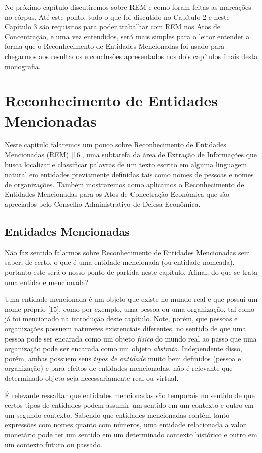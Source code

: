 \documentclass[11pt]{report}
\begin{document}
No próximo capítulo discutiremos sobre REM e como foram feitas as marcações no córpus. Até este ponto, tudo o que foi discutido no Capítulo 2 e neste Capítulo 3 são
requisitos para poder trabalhar com REM nos Atos de Concentração, e uma vez entendidos, será mais simples para o leitor entender a forma que o Reconhecimento de Entidades
Mencionadas foi usado para chegarmos aos resultados e conclusões apresentados nos dois capítulos finais desta monografia.

\pagebreak
\chapter{Reconhecimento de Entidades Mencionadas}

\indent\indent Neste capítulo falaremos um pouco sobre Reconhecimento de Entidades Mencionadas (REM) [16], uma subtarefa da área de Extração de Informações que busca localizar e classificar
palavras de um texto escrito em alguma linguagem natural em entidades previamente definidas tais como nomes de pessoas e nomes de organizações. Também mostraremos como
aplicamos o Reconhecimento de Entidades Mencionadas para os Atos de Concetração Econômica que são apreciados pelo Conselho Administrativo de Defesa Econômica.

\section{Entidades Mencionadas}

\indent\indent Não faz sentido falarmos sobre Reconhecimento de Entidades Mencionadas sem saber, de certo, o que é uma entidade mencionada (ou entidade nomeada), portanto este
será o nosso ponto de partida neste capítulo. Afinal, do que se trata uma entidade mencionada?

Uma entidade mencionada é um objeto que existe no mundo real e que possui um nome próprio [15], como por exemplo, uma pessoa ou uma organização, tal como já foi mencionado na introdução
deste capítulo. Note, porém, que pessoas e organizações possuem naturezes existenciais diferentes, no sentido de que uma pessoa pode ser encarada como um objeto \textit{físico} do mundo real
ao passo que uma organização pode ser encarada como um objeto \textit{abstrato}. Independente disso, porém, ambas possuem seus \textit{tipos de entidade} muito bem definidos
(pessoa e organização) e para efeitos de entidades mencionadas, não é relevante que determinado objeto seja necessariamente real ou virtual.

É relevante ressaltar que entidades mencionadas são temporais no sentido de que certos tipos de entidades podem assumir um sentido em um contexto e outro em um segundo contexto.
Sabendo que entidades mencionadas contém tanto expressões com nomes quanto com números, uma entidade relacionada a valor monetário pode ter um sentido em um determinado
contexto histórico e outro em um contexto futuro ou passado.
\end{document}
